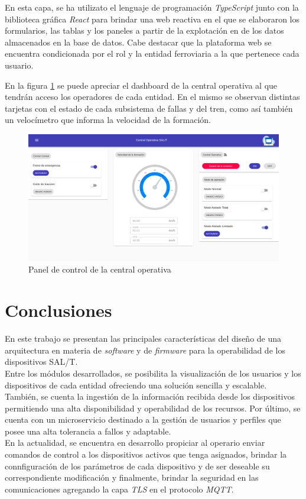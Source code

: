 \documentclass[a4paper]{IEEEtran}
\begin{document}
En esta capa, se ha utilizato el lenguaje de programación \textit{TypeScript} \cite{b17} junto con la biblioteca gráfica \textit{React} \cite{b18} para brindar una web reactiva en el que se elaboraron los formularios, las tablas y los paneles a partir de la explotación en de los datos almacenados en la base de datos. Cabe destacar que la plataforma web se encuentra condicionada por el rol y la entidad ferroviaria a la que pertenece cada usuario.

En la figura \ref{fig:dashboard} se puede apreciar el dashboard de la central operativa al que tendrán acceso los operadores de cada entidad.
En el mismo se observan distintas tarjetas con el estado de cada subsistema de fallas y del tren, como así también un velocímetro que
informa la velocidad de la formación.

\begin{figure}[ht]
\centering 
\includegraphics[width=.47\textwidth]{images/cental.png}
\caption{Panel de control de la central operativa}
\label{fig:dashboard}
\end{figure}

\section{Conclusiones}

En este trabajo se presentan las principales características del diseño de una arquitectura en materia de \textit{software} y de \textit{firmware} para la operabilidad de los dispositivos SAL/T.
\\

Entre los módulos desarrollados, se posibilita la visualización de los usuarios y los dispositivos de cada entidad ofreciendo una solución sencilla y escalable. También, se cuenta la ingestión de la información recibida desde los dispositivos permitiendo una alta disponibilidad y operabilidad de los recursos. Por último, se cuenta con un microservicio destinado a la gestión de usuarios y perfiles que posee una alta tolerancia a fallos y adaptable.
\\

En la actualidad, se encuentra en desarrollo propiciar al operario enviar comandos de control a los dispositivos activos que tenga asignados, brindar la connfiguración de los parámetros de cada dispositivo y de ser deseable su correspondiente modificación y finalmente, brindar la seguridad en las comunicaciones agregando la capa \textit{TLS} en el protocolo \textit{MQTT}. 
\end{document}
